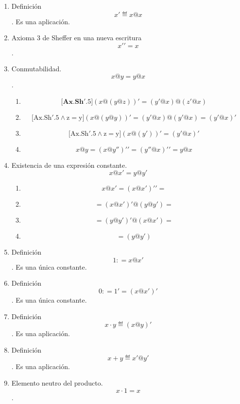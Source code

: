 \documentclass[
]{article}
\providecommand{\tightlist}{%
  \setlength{\itemsep}{0pt}\setlength{\parskip}{0pt}}
\begin{document}
\begin{enumerate}
\begin{enumerate}
\begin{enumerate}
\begin{enumerate}
        \begin{enumerate}
        \def\labelenumv{\arabic{enumv}.}
        \item
          Definición \[x' ≝ x@x\]. Es una aplicación.
        \item
          Axioma 3 de Sheffer en una nueva escritura \[x'{' = x}\].
        \item
          Conmutabilidad. \[x@{y = y}@x\].

          \begin{enumerate}
          \def\labelenumvi{\arabic{enumvi}.}
          \tightlist
          \item
            \[\mathbf{\lbrack{{Ax.Sh}\mathrm{'}.5}\rbrack}{({x@{({y@z})}})}{' = {({y'@x})}}@{({z'@x})}\]
          \item
            \[\mathbf{\mathrm{\lbrack{{Ax.Sh}'{{.5 \land z} = y}}\rbrack}}{({x@{({y@y})}})}{' = {({y'@x})}}@{{({y'@x})} = {({y'@x})}}'\]
          \item
            \[\mathbf{\mathrm{\lbrack{{Ax.Sh}'{{.5 \land z} = y}}\rbrack}}{({x@{({y'})}})}{' = {({y'@x})}}'\]
          \item
            \[x@{y = {({x@y''})}}'{' = {({y''@x})}}'{' = {y@x}}\]
          \end{enumerate}
        \item
          Existencia de una expresión constante. \[x@x{' = y}@y'\]

          \begin{enumerate}
          \def\labelenumvi{\arabic{enumvi}.}
          \tightlist
          \item
            \[{{x@{x'}} = {({x@{x'}})}}'{' =}\]
          \item
            \[{= {({x@{x'}})}}'@{{({y@{y'}})} =}\]
          \item
            \[{= {({y@{y'}})}}'@{{({x@{x'}})} =}\]
          \item
            \[= {({y@{y'}})}\]
          \end{enumerate}
        \item
          Definición \[1{: = x}@x'\]. Es una única constante.
        \item
          Definición \[0{: = 1}{' = {({x@x'})}}'\]. Es una única
          constante.
        \item
          Definición \[{x \cdot y} ≝ {({x@y})}'\]. Es una aplicación.
        \item
          Definición \[{x + y} ≝ {x'@y'}\]. Es una aplicación.
        \item
          Elemento neutro del producto. \[{x \cdot 1} = x\].


\end{enumerate}
\end{enumerate}
\end{enumerate}
\end{enumerate}
\end{enumerate}
\end{document}

